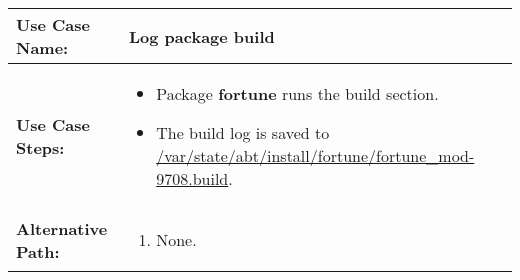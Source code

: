 \medskip

\begin{tabularx}{\linewidth}{|l|X|}
\hline
\textbf{Use Case Name:} & \textbf{Log package build} \\
\hline
\textbf{Use Case Steps:} & 
\begin{minipage}{\linewidth} 
  \vspace{0.05em}
  \begin{itemize}
    \item Package \textbf{fortune} runs the build section.
    \item The build log is saved to \url{/var/state/abt/install/fortune/fortune_mod-9708.build}.
  \end{itemize}
  \vspace{0.05em}
\end{minipage}
\\
\hline 
\textbf{Alternative Path:} &
\begin{minipage}{\linewidth}
  \vspace{0.05em} 
  \begin{enumerate}
    \item None.
  \end{enumerate}
  \vspace{0.05em} 
\end{minipage}
\\
\hline
\end{tabularx}